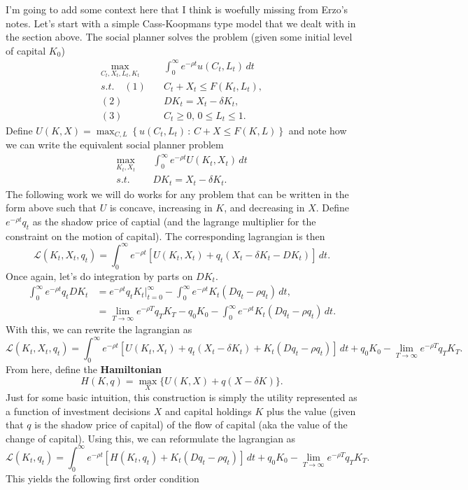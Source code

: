 \documentclass[11pt,english]{article}
\begin{document}
I'm going to add some context here that I think is woefully missing from Erzo's notes. Let's start with a simple Cass-Koopmans type model that we dealt with in the section above. The social planner solves the problem (given some initial level of capital $K_0$)
\begin{align*}
\max_{C_t, X_t, L_t, K_t}&\quad \int_0^\infty e^{-\rho t} u(C_t, L_t)\,dt\\
s.t.\quad (1)&\quad C_t + X_t \leq F(K_t, L_t),\\
(2)&\quad DK_t = X_t - \delta K_t,\\
(3)&\quad C_t \geq 0,\, 0 \leq L_t \leq 1.
\end{align*} Define $U(K, X) = \max_{C,L}\left\{u(C_t, L_t)\,:\,C + X\leq F(K, L)\right\}$ and note how we can write the equivalent social planner problem 
\begin{align*}
\max_{K_t, X_t}&\quad \int_0^\infty e^{-\rho t}U(K_t, X_t)\,dt\\
s.t.&\quad DK_t = X_t - \delta K_t.
\end{align*} The following work we will do works for any problem that can be written in the form above such that $U$ is concave, increasing in $K$, and decreasing in $X$. Define $e^{-\rho t} q_t$ as the shadow price of captial (and the lagrange multiplier for the constraint on the motion of capital). The corresponding lagrangian is then
$$\mathcal{L}(K_t, X_t, q_t) = \int_0^\infty e^{-\rho t} \left[U(K_t, X_t) + q_t(X_t - \delta K_t - DK_t)\right]\,dt.$$ Once again, let's do integration by parts on $DK_t$.
\begin{align*}
\int_0^\infty e^{-\rho t} q_t DK_t &= e^{-\rho t}q_t K_t\Big|_{t = 0}^\infty - \int_0^\infty e^{-\rho t}K_t(Dq_t - \rho q_t)\,dt,\\
&= \lim_{T\to \infty} e^{-\rho T} q_T K_T - q_0K_0 - \int_0^\infty e^{-\rho t}K_t(Dq_t - \rho q_t)\,dt.
\end{align*} With this, we can rewrite the lagrangian as $$\mathcal{L}(K_t, X_t, q_t) = \int_0^\infty e^{-\rho t} \left[U(K_t, X_t) + q_t(X_t - \delta K_t) + K_t(Dq_t - \rho q_t)\right]\,dt + q_0K_0 - \lim_{T\to \infty}e^{-\rho T} q_T K_T.$$ From here, define the \textbf{Hamiltonian} $$H(K, q) = \max_{X}\{U(K, X) + q(X - \delta K)\}.$$ Just for some basic intuition, this construction is simply the utility represented as a function of investment decisions $X$ and capital holdings $K$ plus the value (given that $q$ is the shadow price of capital) of the flow of capital (aka the value of the change of capital). Using this, we can reformulate the lagrangian as $$\mathcal{L}(K_t, q_t) = \int_0^\infty e^{-\rho t} \left[H(K_t, q_t) + K_t(Dq_t - \rho q_t)\right]\,dt + q_0K_0 - \lim_{T\to \infty}e^{-\rho T} q_T K_T.$$ This yields the following first order condition
\end{document}
